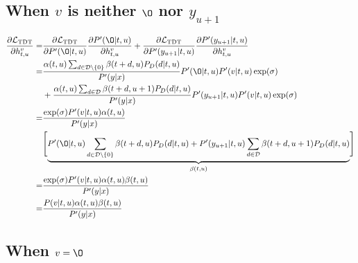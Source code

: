 \documentclass{article}
\begin{document}
\subsection{When $v$ is neither $\O $ nor $y_{u+1}$}
\begin{equation} \label{under_norm_1}
\begin{aligned}
 \frac{\partial{\mathcal{L}_\text{TDT}}}{\partial{h_{t, u}^v}} = & \frac{\partial{\mathcal{L}_\text{TDT}}}{\partial{P'(\O| t, u)}} \frac{\partial{P'(\O| t, u)}}{\partial{h_{t, u}^v}} + \frac{\partial{\mathcal{L}_\text{TDT}}}{\partial{P'(y_{u+1}| t, u)}} \frac{\partial{P'(y_{u+1}| t, u)}}{\partial{h_{t, u}^v}} \\
=  & \frac{\alpha(t, u) \sum_{d \in \mathcal{D} \setminus \{0\}} {\beta(t + d,u) P_D(d|t, u)}} {P'(y|x)} P'(\O| t, u) P'(v| t, u) \exp(\sigma) \\
 & + \frac{\alpha(t, u) \sum_{d \in \mathcal{D}}                 {\beta(t + d,u+1)P_D(d|t,u)}} {P'(y|x)} P'(y_{u+1}| t, u) P'(v|t, u) \exp(\sigma) \\
 = & \frac{\exp(\sigma) P'(v|t, u) \alpha(t, u)}{P'(y|x)}\\
 & \Biggl[\underbrace{ P'(\O|t, u)  \sum_{d \in \mathcal{D} \setminus \{0\}} {\beta(t + d,u) P_D(d|t, u)} + P'(y_{u+1}|t, u)  \sum_{d \in \mathcal{D}}                 {\beta(t + d,u+1)P_D(d|t,u)} }_{\beta(t,u)} \Biggr] \\
 = & \frac{\exp(\sigma) P'(v|t, u) \alpha(t, u) \beta(t,u)}{P'(y|x)} \\
 = & \frac{P(v|t, u) \alpha(t, u) \beta(t,u)}{P'(y|x)} \\
\end{aligned}
\end{equation}

\subsection{When $v = \O$}
\end{document}
